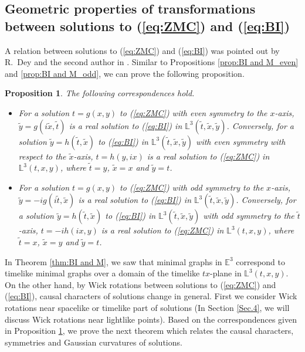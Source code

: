 \documentclass[12pt,amstex]{amsart}%
\theoremstyle{plain} %
\newtheorem{proposition}[theorem]{Proposition}
\theoremstyle{definition}
\begin{document}
 \subsection{Geometric properties of transformations between solutions to (\ref{eq:ZMC}) and (\ref{eq:BI})}
A relation between solutions to (\ref{eq:ZMC}) and (\ref{eq:BI}) was pointed out by R.\ Dey and the second author in \cite[Proposition 2.1]{DS}. Similar to Propositions \ref{prop:BI and M_even} and \ref{prop:BI and M_odd}, we can prove the following proposition.
\begin{proposition}\label{prop:BI and ZMC}
The following correspondences hold.
\begin{itemize}
\item[(i)] For a solution $t=g(x,y)$ to (\ref{eq:ZMC}) with even symmetry to the $x$-axis, $\tilde{y}=g(i\tilde{x},\tilde{t})$ is a real solution to (\ref{eq:BI}) in $\mathbb{L}^3(\tilde{t},\tilde{x},\tilde{y})$. Conversely, for a solution $\tilde{y}=h(\tilde{t},\tilde{x})$ to (\ref{eq:BI}) in $\mathbb{L}^3(\tilde{t},\tilde{x},\tilde{y})$ with even symmetry with respect to the $\tilde{x}$-axis, $t=h(y,ix)$ is a real solution to (\ref{eq:ZMC}) in $\mathbb{L}^3(t,x,y)$, where $\tilde{t}=y$, $\tilde{x}=x$ and $\tilde{y}=t$.
\item[(ii)] For a solution $t=g(x,y)$ to (\ref{eq:ZMC}) with odd symmetry to the $x$-axis, $\tilde{y}=-ig(i\tilde{t},\tilde{x})$ is a real solution to (\ref{eq:BI}) in $\mathbb{L}^3(\tilde{t},\tilde{x},\tilde{y})$. Conversely, for a solution $\tilde{y}=h(\tilde{t},\tilde{x})$ to (\ref{eq:BI}) in $\mathbb{L}^3(\tilde{t},\tilde{x},\tilde{y})$ with odd symmetry to the $\tilde{t}$-axis, $t=-ih(ix,y)$ is a real solution to (\ref{eq:ZMC}) in $\mathbb{L}^3(t,x,y)$, where $\tilde{t}=x$, $\tilde{x}=y$ and $\tilde{y}=t$.
\end{itemize}
\end{proposition}
In Theorem \ref{thm:BI and M}, we saw that minimal graphs in $\mathbb{E}^3$ correspond to timelike minimal graphs over a domain of the timelike $tx$-plane in $\mathbb{L}^3(t,x,y)$. On the other hand, by Wick rotations between solutions to (\ref{eq:ZMC}) and (\ref{eq:BI}), causal characters of solutions change in general. First we consider Wick rotations near spacelike or timelike part of solutions (In Section \ref{Sec.4}, we will discuss Wick rotations near lightlike points). Based on the correspondences given in Proposition \ref{prop:BI and ZMC}, we prove the next theorem which relates the causal characters, symmetries and Gaussian curvatures of solutions. 
\end{document}
